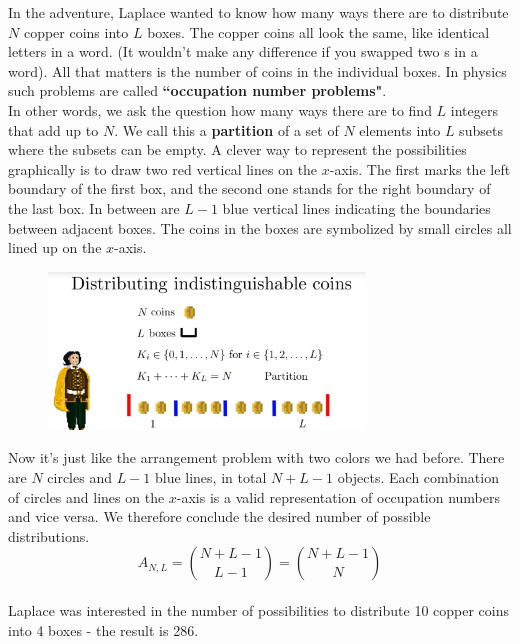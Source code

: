 \documentclass[12pt, a4paper]{scrartcl}
\begin{document}
In the adventure, Laplace wanted to know how many ways there are to distribute $N$ copper coins into $L$ boxes.
The copper coins all look the same, like identical letters in a word. (It wouldn't make any difference if you swapped two s in a word).
All that matters is the number of coins in the individual boxes. In physics such problems are called \textbf{``occupation number problems"}.\\

In other words, we ask the question how many ways there are to find $L$ integers that add up to $N$. We call this a \textbf{partition} of a set of $N$ elements into $L$ subsets where the subsets can be empty.
A clever way to represent the possibilities graphically is to draw two red vertical lines on the $x$-axis. The first marks the left boundary of the first box, and the second one stands for the right boundary of the last box.
In between are $L-1$ blue vertical lines indicating the boundaries between adjacent boxes.
The coins in the boxes are symbolized by small circles all lined up on the $x$-axis.
 \begin{figure}[H]
	\centering
	\includegraphics[width=0.75\textwidth]{4_12.png}
\end{figure}
Now it’s just like the arrangement problem with two colors we had before. There are $N$ circles and $L-1$ blue lines, in total $N+L-1$ objects. Each combination of circles and lines on the $x$-axis is a valid representation of occupation numbers and vice versa. We therefore conclude the desired number of possible distributions.\\
\begin{equation*}\boxed{A_{N,L}={N+L-1\choose L-1}={N+L-1\choose N}
}\end{equation*}\\
Laplace was interested in the number of possibilities to distribute 10 copper coins into 4 boxes - the result is 286.\\
 
\end{document}
